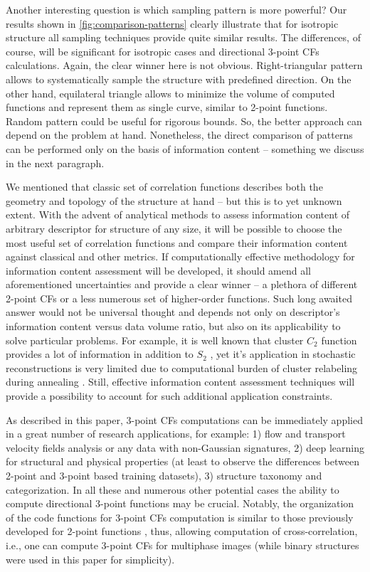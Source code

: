 \documentclass[reprint,amsmath,amssymb,aps,pre,showkeys,showpacs]{revtex4-1}
\begin{document}
Another interesting question is which sampling pattern is more powerful?
Our results shown in \cref{fig:comparison-patterns} clearly illustrate that
for isotropic structure all sampling techniques provide quite similar results.
The differences, of course, will be significant for isotropic cases and
directional 3-point CFs calculations. Again, the clear winner here is not obvious.
Right-triangular pattern allows to systematically sample the structure with
predefined direction. On the other hand, equilateral triangle allows to
minimize the volume of computed functions and represent them as single curve,
similar to 2-point functions. Random pattern could be useful for rigorous bounds.
So, the better approach can depend on the problem at hand. Nonetheless,
the direct comparison of patterns can be performed only on the basis of
information content -- something we discuss in the next paragraph.

We mentioned that classic set of correlation functions describes both the
geometry and topology of the structure at hand -- but this is to yet unknown
extent. With the advent of analytical methods \cite{CHERKASOV2024129400} to
assess information content of arbitrary descriptor for structure of any size, it
will be possible to choose the most useful set of correlation functions and
compare their information content against classical and other metrics. If
computationally effective methodology for information content assessment will be
developed, it should amend all aforementioned uncertainties and provide a clear
winner -- a plethora of different 2-point CFs or a less numerous set of
higher-order functions. Such long awaited answer would not be universal thought
and depends not only on descriptor's information content versus data volume
ratio, but also on its applicability to solve particular problems. For example,
it is well known that cluster $C_2$ function provides a lot of information in
addition to $S_2$ \cite{JiaoPNAS}, yet it's application in stochastic
reconstructions is very limited due to computational burden of cluster
relabeling during annealing \cite{karsanina2015}. Still, effective information
content assessment techniques will provide a possibility to account for such
additional application constraints.

As described in this paper, 3-point CFs computations can be immediately applied
in a great number of research applications, for example: 1) flow and transport
velocity fields analysis or any data with non-Gaussian signatures, 2) deep
learning for structural and physical properties (at least to observe the
differences between 2-point and 3-point based training datasets), 3) structure
taxonomy and categorization. In all these and numerous other potential cases the
ability to compute directional 3-point functions may be crucial. Notably, the
organization of the code functions for 3-point CFs computation is similar to
those previously developed for 2-point functions \cite{CFsjlpaper}, thus,
allowing computation of cross-correlation, i.e., one can compute 3-point CFs for
multiphase images (while binary structures were used in this paper for
simplicity).
\end{document}
